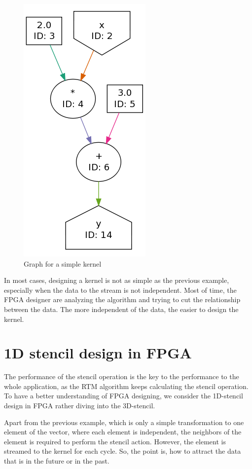 \begin{figure}
  \centering
  \includegraphics[scale=0.5]{img/SimpleKernel_original.png}
  \caption{Graph for a simple kernel}
  \label{fig:fx}
\end{figure}

In most cases, designing a kernel is not as simple as the previous example,
especially when the data to the stream is not independent. Most of time,
the FPGA designer are analyzing the algorithm and trying to cut the
relationship between the data. The more independent of the data, the easier
to design the kernel.


\section{1D stencil design in FPGA} %
\label{sub:1D stencil design in FPGA}



The performance of the stencil operation is the key to the performance to
the whole application, as the RTM algorithm keeps calculating the stencil
operation. To have a better understanding of FPGA designing, we consider
the 1D-stencil design in FPGA rather diving into the 3D-stencil.

Apart from the previous example, which is only a simple transformation to
one element of the vector, where each element is independent, the neighbors
of the element is required to perform the stencil action. However, the
element is streamed to the kernel for each cycle. So, the point is, how to
attract the data that is in the future or in the past.

